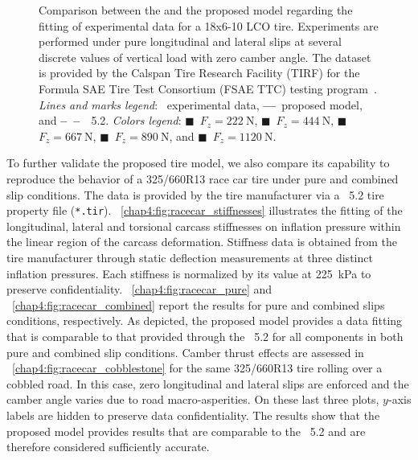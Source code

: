 \begin{figure}
\begin{minipage}[c]{0.29\linewidth}
  \end{minipage}
  \caption{Comparison between the \MagicFormulae{} and the proposed model regarding the fitting of experimental data for a \Hoosier{} 18x6-10 LCO tire. Experiments are performed under pure longitudinal and lateral slips at several discrete values of vertical load with zero camber angle. The dataset is provided by the Calspan Tire Research Facility (TIRF) for the Formula SAE Tire Test Consortium (FSAE TTC) testing program~\cite{kasprzak2006formula}. \emph{Lines and marks legend}: \textbullet~experimental data, \textbf{---}~proposed model, and \textbf{--~--}~\MagicFormulae{}~5.2. \emph{Colors legend}: \textcolor{mycolor1}{$\blacksquare$}~$F_z = \SI{222}{\newton}$, \textcolor{mycolor2}{$\blacksquare$}~$F_z = \SI{444}{\newton}$, \textcolor{mycolor3}{$\blacksquare$}~$F_z = \SI{667}{\newton}$, \textcolor{mycolor4}{$\blacksquare$}~$F_z = \SI{890}{\newton}$, and \textcolor{mycolor5}{$\blacksquare$}~$F_z = \SI{1120}{\newton}$.}
  \label{chap4:fig:fsae_pure}
\end{figure}

To further validate the proposed tire model, we also compare its capability to reproduce the behavior of a 325/660R13 race car tire under pure and combined slip conditions. The data is provided by the tire manufacturer via a \MagicFormulae{}~5.2 tire property file (\texttt{*.tir}). \figurename~\ref{chap4:fig:racecar_stiffnesses} illustrates the fitting of the longitudinal, lateral and torsional carcass stiffnesses on inflation pressure within the linear region of the carcass deformation. Stiffness data is obtained from the tire manufacturer through static deflection measurements at three distinct inflation pressures. Each stiffness is normalized by its value at \SI{225}{\kilo\pascal} to preserve confidentiality. \figurename~\ref{chap4:fig:racecar_pure} and \figurename~\ref{chap4:fig:racecar_combined} report the results for pure and combined slips conditions, respectively. As depicted, the proposed model provides a data fitting that is comparable to that provided through the \MagicFormulae{}~5.2 for all components in both pure and combined slip conditions. Camber thrust effects are assessed in \figurename~\ref{chap4:fig:racecar_cobblestone} for the same 325/660R13 tire rolling over a cobbled road. In this case, zero longitudinal and lateral slips are enforced and the camber angle varies due to road macro-asperities. On these last three plots, $y$-axis labels are hidden to preserve data confidentiality. The results show that the proposed model provides results that are comparable to the \MagicFormulae{}~5.2 and are therefore considered sufficiently accurate.

